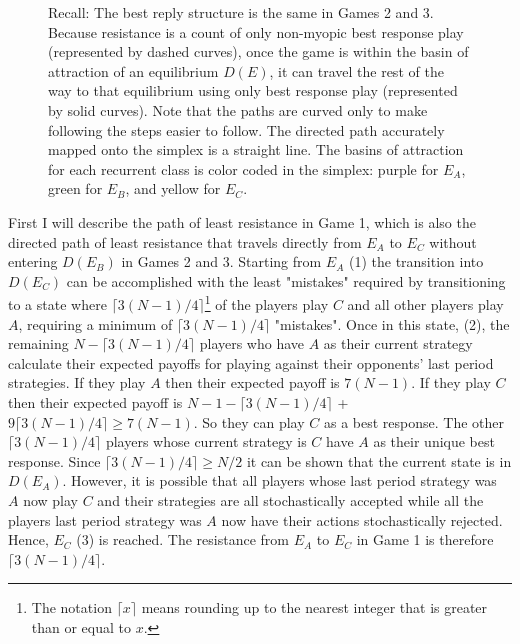 \begin{figure}[h]
\begin{minipage}[c]{.49\textwidth}
\end{minipage}
\vskip12pt
\small
\centering
Recall: The best reply structure is the same in Games 2 and 3.
Because resistance is a count of only non-myopic best response play (represented by dashed curves), once the game is within the basin of attraction of an equilibrium $D(E)$, it can travel the rest of the way to that equilibrium using only best response play (represented by solid curves). Note that the paths are curved only to make following the steps easier to follow. The directed path accurately mapped onto the simplex is a straight line. The basins of attraction for each recurrent class is color coded in the simplex: purple for $E_A$, green for $E_B$, and yellow for $E_C$.

\end{figure}
\justifying
\vskip12pt

First I will describe the path of least resistance in Game 1, which is also the directed path of least resistance that travels directly from $E_A$ to $E_C$ without entering $D(E_B)$ in Games 2 and 3. Starting from $E_A$ (1) the transition into $D(E_C)$ can be accomplished with the least "mistakes" required by transitioning to a state where $\lceil3(N-1)/4 \rceil$\footnote{The notation $\lceil x \rceil$ means rounding up to the nearest integer that is greater than or equal to $x$.} of the players play $C$ and all other players play $A$, requiring a minimum of $\lceil3(N-1)/4 \rceil$ "mistakes". Once in this state, (2), the remaining $N - \lceil3(N-1)/4 \rceil$ players who have $A$ as their current strategy calculate their expected payoffs for playing against their opponents' last period strategies. If they play $A$ then their expected payoff is $7(N-1)$. If they play $C$ then their expected payoff is $N-1 - \lceil3(N-1)/4 \rceil$ + $9 \lceil3(N-1)/4 \rceil \geq 7(N-1)$. So they can play $C$ as a best response. The other $\lceil3(N-1)/4 \rceil$ players whose current strategy is $C$ have $A$ as their unique best response. Since $\lceil3(N-1)/4 \rceil \geq N/2$ it can be shown that the current state is in $D(E_A)$. However, it is possible that all players whose last period strategy was $A$ now play $C$ and their strategies are all stochastically accepted while all the players last period strategy was $A$ now have their actions stochastically rejected. Hence, $E_C$ (3) is reached. The resistance from $E_A$ to $E_C$ in Game 1 is therefore $\lceil3(N-1)/4 \rceil$.

